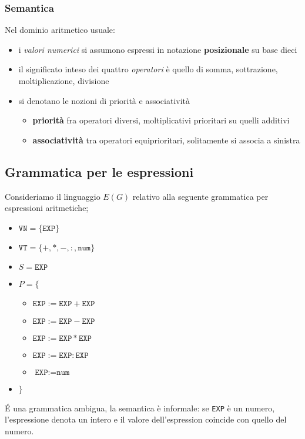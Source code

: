 \subsubsection{Semantica}
Nel dominio aritmetico usuale:
\begin{itemize}
    \item i \textit{valori numerici} si assumono espressi in notazione \textbf{posizionale} su base dieci
    \item il significato inteso dei quattro \textit{operatori} è quello di somma, sottrazione, moltiplicazione, divisione
    \item si denotano le nozioni di priorità e associatività
    \begin{itemize}
        \item \textbf{priorità} fra operatori diversi, moltiplicativi prioritari su quelli additivi
        \item \textbf{associatività} tra operatori equiprioritari, solitamente si associa a sinistra
    \end{itemize}
\end{itemize}

\subsection{Grammatica per le espressioni}
Consideriamo il linguaggio $E(G)$ relativo alla seguente grammatica per espressioni aritmetiche;
\begin{itemize}
    \item $\texttt{VN} = \{ \texttt{EXP}\}$
    \item $\texttt{VT} = \{+, *, -, :, \texttt{num}\}$
    \item $S = \texttt{EXP}$
    \item $P = \{$
    \begin{itemize}
        \item $\texttt{EXP} := \texttt{EXP} + \texttt{EXP}$
        \item $\texttt{EXP} := \texttt{EXP} - \texttt{EXP}$
        \item $\texttt{EXP} := \texttt{EXP} * \texttt{EXP}$
        \item $\texttt{EXP} := \texttt{EXP} : \texttt{EXP}$
        \item $\texttt{EXP} := \texttt{num}$ 
    \end{itemize}
    \item $\}$
\end{itemize}

É una grammatica ambigua, la semantica è informale: se \texttt{EXP} è un numero, l'espressione denota un intero e il valore dell'espression coincide con quello del numero.


